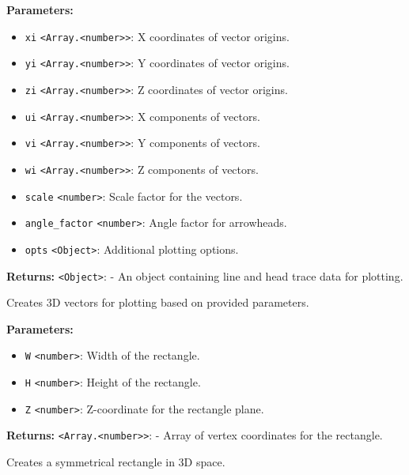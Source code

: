 \documentclass[12pt,a4paper]{article}
\begin{document}
\noindent \textbf{Parameters:}
\begin{itemize}
  \item \texttt{xi} \texttt{<Array.<number>>}: X coordinates of vector origins.
  \item \texttt{yi} \texttt{<Array.<number>>}: Y coordinates of vector origins.
  \item \texttt{zi} \texttt{<Array.<number>>}: Z coordinates of vector origins.
  \item \texttt{ui} \texttt{<Array.<number>>}: X components of vectors.
  \item \texttt{vi} \texttt{<Array.<number>>}: Y components of vectors.
  \item \texttt{wi} \texttt{<Array.<number>>}: Z components of vectors.
  \item \texttt{scale} \texttt{<number>}: Scale factor for the vectors.
  \item \texttt{angle\_factor} \texttt{<number>}: Angle factor for arrowheads.
  \item \texttt{opts} \texttt{<Object>}: Additional plotting options.
\end{itemize}

\noindent \textbf{Returns:} \texttt{<Object>}: - An object containing line and head trace data for plotting.

\noindent Creates 3D vectors for plotting based on provided parameters.

\vspace{5mm}
\noindent {}


\noindent \textbf{Parameters:}
\begin{itemize}
  \item \texttt{W} \texttt{<number>}: Width of the rectangle.
  \item \texttt{H} \texttt{<number>}: Height of the rectangle.
  \item \texttt{Z} \texttt{<number>}: Z-coordinate for the rectangle plane.
\end{itemize}

\noindent \textbf{Returns:} \texttt{<Array.<number>>}: - Array of vertex coordinates for the rectangle.

\noindent Creates a symmetrical rectangle in 3D space.

\vspace{5mm}
\noindent {}
\end{document}
